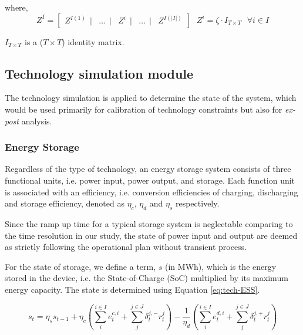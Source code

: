 where,
\begin{equation*}
Z^I = \begin{bmatrix}
Z^{I(1)}~~|&\dots~~|&Z^i~~|&\dots~~|&Z^{I(|I|)}
\end{bmatrix}~~~
Z^i = \zeta \cdot I_{T\times T} ~~~ \forall i \in I
\end{equation*}

$I_{T \times T}$ is a ($T \times T$) identity matrix. 

\subsection{Technology simulation module}
The technology simulation is applied to determine the state of the system, which would be used primarily for calibration of technology constraints but also for \textit{ex-post} analysis.

\subsubsection{Energy Storage}
Regardless of the type of technology, an energy storage system consists of three functional units, i.e. power input, power output, and storage. Each function unit is associated with an efficiency, i.e. conversion efficiencies of charging, discharging and storage efficiency, denoted as $\eta_c$, $\eta_d$ and $\eta_s$ respectively.

Since the ramp up time for a typical storage system is neglectable comparing to the time resolution in our study, the state of power input and output are deemed as strictly following the operational plan without transient process.

For the state of storage, we define a term, $s$ (in MWh), which is the energy stored in the device, i.e. the State-of-Charge (SoC) multiplied by its maximum energy capacity. The state is determined using Equation \ref{eq:tech-ESS}.

\begin{equation}
\label{eq:tech-ESS}
s_t = \eta_s s_{t-1} + \eta_c (\sum_{i}^{i \in I} e_t^{c,i} + \sum_{j}^{j \in J}\delta_t^{j,-}r_t^j)- \frac{1}{\eta_d} (\sum_{i}^{i \in I} e_t^{d,i} + \sum_{j}^{j \in J}\delta_t^{j,+}r_t^j)
\end{equation} 

